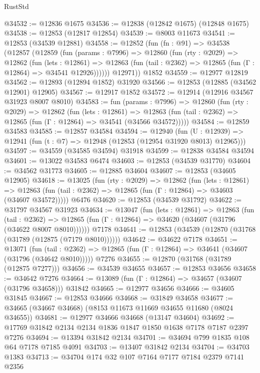 \begin{lexlean}{RustStd}
\begin{coremodule}
@34532 := @12836 @1675
@34536 := @12838 (@12842 @1675) (@12848 @1675)
@34538 := @12853 (@12817 @12854)
@34539 := @8003 @11673
@34541 := @12853 (@34539 @12881)
@34558 := @12852
    (fun (fn : @91) =>
    @34538
      (@12857
        (@12859
          (fun (params : @7996) =>
          @12860
            (fun (rty : @2029) =>
            @12862
              (fun (lets : @12861) =>
              @12863 (fun (tail : @2362) => @12865 (fun (Γ : @12864) => @34541 @12926))))))
        @12971))
    @1852
@34559 := @12977 @12819
@34562 := @12893 (@12894 @1852) @31920
@34566 := @12853 (@12885 (@34562 @12901) @12905)
@34567 := @12917 @1852
@34572 := @12914 (@12916 @34567 @31923 @8007 @8010)
@34583 := fun (params : @7996) =>
  @12860
    (fun (rty : @2029) =>
    @12862
      (fun (lets : @12861) =>
      @12863 (fun (tail : @2362) => @12865 (fun (Γ : @12864) => @34541 (@34566 @34572)))))
@34584 := @12859 @34583
@34585 := @12857 @34584
@34594 := @12940
    (fun (U : @12939) => @12941 (fun (t : @7) => @12948 (@12853 (@12954 @31920 @8013) @12965)))
@34597 := @34559 (@34585 @34594) @31918
@34599 := @12838 @34584 @34594
@34601 := @13022 @34583 @6474
@34603 := @12853 (@34539 @31770)
@34604 := @34562 @31773
@34605 := @12885 @34604
@34607 := @12853 (@34605 @12905)
@34618 := @13025
    (fun (rty : @2029) =>
    @12862
      (fun (lets : @12861) =>
      @12863 (fun (tail : @2362) => @12865 (fun (Γ : @12864) => @34603 (@34607 @34572)))))
    @6476
@34620 := @12853 (@34539 @31792)
@34622 := @31797 @34567 @31923
@34634 := @13047
    (fun (lets : @12861) =>
    @12863
      (fun (tail : @2362) =>
      @12865 (fun (Γ : @12864) => @34620 (@34607 (@31796 (@34622 @8007 @8010))))))
    @7178
@34641 := @12853 (@34539 (@12870 (@31768 (@31789 (@12875 (@7179 @8010))))))
@34642 := @34622 @7178
@34651 := @13071
    (fun (tail : @2362) => @12865 (fun (Γ : @12864) => @34641 (@34607 (@31796 (@34642 @8010)))))
    @7276
@34655 := @12870 (@31768 (@31789 (@12875 @7277)))
@34656 := @34539 @34655
@34657 := @12853 @34656
@34658 := @34642 @7276
@34664 := @13089 (fun (Γ : @12864) => @34657 (@34607 (@31796 @34658))) @31842
@34665 := @12977 @34656
@34666 := @34605 @31845
@34667 := @12853 @34666
@34668 := @31849 @34658
@34677 := @34665 (@34667 @34668) (@8153 @11673 @11669 @34655 @11680 (@8024 @34655))
@34681 := @12977 @34666 @34668 (@13147 @34604)
@34692 := @17769 @31842 @2134 @2134 @1836 @1847 @1850 @1638 @7178 @7187 @2397 @7276
@34694 := @13394 @31842 @2134
@34701 := @34694 @799 @1835 @108 @64 @7178 @7185 @4091
@34703 := @13407 @31842 @2134
@34704 := @34703 @1383
@34713 := @34704 @174 @32 @107 @7164 @7177 @7184 @2379 @7141 @2356

\end{coremodule}
\end{lexlean}

